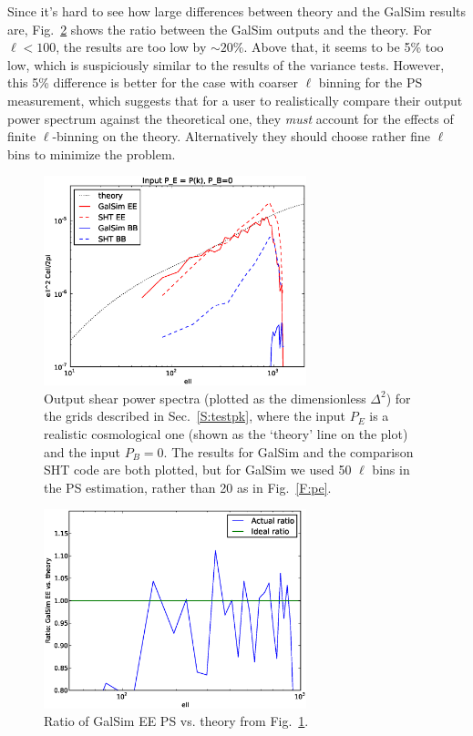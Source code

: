 \documentclass[preprint]{aastex}
\begin{document}
Since it's hard to see how large differences between theory and the
GalSim results are, Fig.~\ref{F:pe-fine-ratio} shows the ratio between
the GalSim outputs and the theory.  For $\ell<100$, the results are
too low by $\sim 20$\%.  Above that, it seems to be 5\% too low, which
is suspiciously similar to the results of the variance tests.
However, this 5\% difference is better for the case with coarser
$\ell$ binning for the PS measurement, which 
suggests that for a user to realistically compare their output power
spectrum against the theoretical one, they {\em must} account for
the effects of finite $\ell$-binning on the theory.  Alternatively
they should choose rather fine $\ell$ bins to minimize the problem.
\begin{figure}
\begin{center}
\includegraphics[width=3in]{../external/test_gridshear/output/compare_input_pe.fine.eps}
\caption{Output shear power spectra (plotted as the dimensionless
  $\Delta^2$) for the grids described in Sec.~\ref{S:testpk}, where
  the input $P_E$ is a realistic cosmological one (shown as the `theory' line on
  the plot) and the input $P_B=0$. The results for GalSim and the
  comparison SHT code are both plotted, but for GalSim we used 50
  $\ell$ bins in the PS estimation, rather than 20 as in Fig.~\ref{F:pe}.\label{F:pe-fine}}
\end{center}
\end{figure}
\begin{figure}
\begin{center}
\includegraphics[width=3in]{../external/test_gridshear/output/compare_input_pe.fine.ratio.eps}
\caption{Ratio of GalSim EE PS vs. theory from Fig.~\ref{F:pe-fine}.\label{F:pe-fine-ratio}}
\end{center}
\end{figure}
\end{document}
